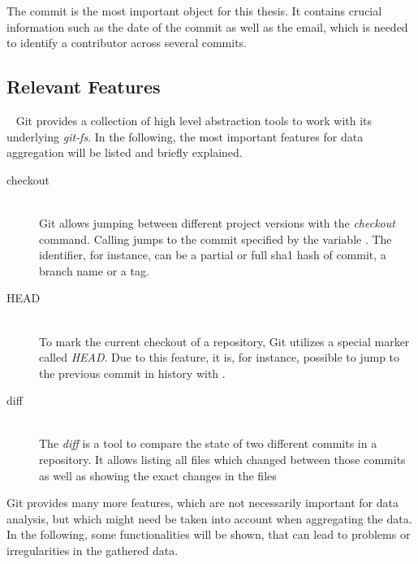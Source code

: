 The commit is the most important object for this thesis.
It contains crucial information such as the date of the commit as well as the email, which is needed to identify a contributor across several commits.

\subsection{Relevant Features}~\label{git-features}
Git provides a collection of high level abstraction tools to work with its underlying \emph{git-fs}.
In the following, the most important features for data aggregation will be listed and briefly explained.

\begin{description}
    \item[checkout] \hfill \\
        Git allows jumping between different project versions with the \emph{checkout} command.
        Calling  jumps to the commit specified by the variable .
        The identifier, for instance, can be a partial or full \ac{sha1} hash of commit, a branch name or a tag.

    \item[HEAD] \hfill \\
        To mark the current checkout of a repository, Git utilizes a special marker called \emph{HEAD}.
        Due to this feature, it is, for instance, possible to jump to the previous commit in history with .

    \item[diff] \hfill \\
        The \emph{diff} is a tool to compare the state of two different commits in a repository.
        It allows listing all files which changed between those commits as well as showing the exact changes in the files

\end{description}

Git provides many more features, which are not necessarily important for data analysis, but which might need be taken into account when aggregating the data.
In the following, some functionalities will be shown, that can lead to problems or irregularities in the gathered data.

